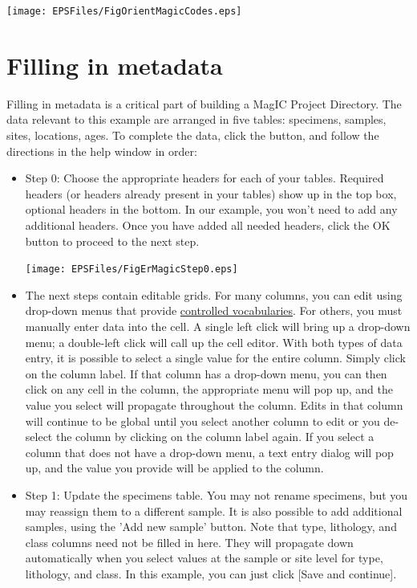 \documentclass[11pt]{book}
\begin{document}
{{\texttt{[image: EPSFiles/FigOrientMagicCodes.eps]}

\section{Filling in metadata}

Filling in metadata is a critical part of building a MagIC Project Directory. The data relevant to this example are arranged in five tables: specimens, samples, sites, locations, ages. To complete the data, click the button, and follow the directions in the help window in order:

\begin{itemize}
\item Step 0: Choose the appropriate headers for each of your tables.  Required headers (or headers already present in your tables) show up in the top box, optional headers in the bottom.  In our example, you won't need to add any additional headers.  Once you have added all needed headers, click the OK button to proceed to the next step.

 \texttt{[image: EPSFiles/FigErMagicStep0.eps]}

 \item The next steps contain editable grids.  For many columns, you can edit using drop-down menus that provide \href{http://earthref.org/MAGIC/shortlists.htm}{controlled vocabularies}.  For others, you must manually enter data into the cell.  A single left click will bring up a drop-down menu; a double-left click will call up the cell editor.  With both types of data entry, it is possible to select a single value for the entire column. Simply click on the column label.  If that column has a drop-down menu, you can then click on any cell in the column, the appropriate menu will pop up, and the value you select will propagate throughout the column.  Edits in that column will continue to be global until you select another column to edit or you de-select the column by clicking on the column label again.  If you select a column that does not have a drop-down menu, a text entry dialog will pop up, and the value you provide will be applied to the column.

 \item Step 1: Update the specimens table.  You may not rename specimens, but you may reassign them to a different sample.  It is also possible to add additional samples, using the 'Add new sample' button.  Note that type, lithology, and class columns need not be filled in here.  They will propagate down automatically when you select values at the sample or site level for type, lithology, and class.  In this example, you can just click [Save and continue].


\end{itemize}}}
\end{document}
